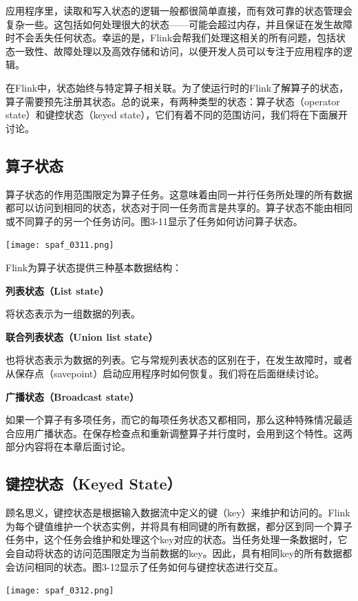 \documentclass[oneside]{ctexbook}
\begin{document}
应用程序里，读取和写入状态的逻辑一般都很简单直接，而有效可靠的状态管理会复杂一些。这包括如何处理很大的状态——可能会超过内存，并且保证在发生故障时不会丢失任何状态。幸运的是，Flink会帮我们处理这相关的所有问题，包括状态一致性、故障处理以及高效存储和访问，以便开发人员可以专注于应用程序的逻辑。

在Flink中，状态始终与特定算子相关联。为了使运行时的Flink了解算子的状态，算子需要预先注册其状态。总的说来，有两种类型的状态：算子状态（operator state）和键控状态（keyed state），它们有着不同的范围访问，我们将在下面展开讨论。

\subsection{算子状态}

算子状态的作用范围限定为算子任务。这意味着由同一并行任务所处理的所有数据都可以访问到相同的状态，状态对于同一任务而言是共享的。算子状态不能由相同或不同算子的另一个任务访问。图3-11显示了任务如何访问算子状态。

\noindent \texttt{[image: spaf\_0311.png]}

Flink为算子状态提供三种基本数据结构：

\textbf{列表状态（List state）}

将状态表示为一组数据的列表。

\textbf{联合列表状态（Union list state）}

也将状态表示为数据的列表。它与常规列表状态的区别在于，在发生故障时，或者从保存点（savepoint）启动应用程序时如何恢复。我们将在后面继续讨论。

\textbf{广播状态（Broadcast state）}

如果一个算子有多项任务，而它的每项任务状态又都相同，那么这种特殊情况最适合应用广播状态。在保存检查点和重新调整算子并行度时，会用到这个特性。这两部分内容将在本章后面讨论。

\subsection{键控状态（Keyed State）}

顾名思义，键控状态是根据输入数据流中定义的键（key）来维护和访问的。Flink为每个键值维护一个状态实例，并将具有相同键的所有数据，都分区到同一个算子任务中，这个任务会维护和处理这个key对应的状态。当任务处理一条数据时，它会自动将状态的访问范围限定为当前数据的key。因此，具有相同key的所有数据都会访问相同的状态。图3-12显示了任务如何与键控状态进行交互。

\noindent \texttt{[image: spaf\_0312.png]}
\end{document}
